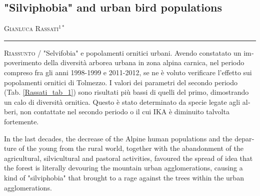 \begin{otherlanguage}{english}
\setcounter{figure}{0}
\setcounter{table}{0}

\begin{adjustwidth}{-3.5cm}{0cm}
\pagestyle{CIOpage}
\chapter*[]{"Silviphobia" and urban bird populations}

\textsc{Gianluca Rassati}$^{1*}$\\

\noindent\color{MUSEBLUE}\rule{27cm}{2pt}
\vspace{1cm}
\end{adjustwidth}

{\small
\noindent\textsc{\color{MUSEBLUE} Riassunto} / "Selvifobia" e popolamenti ornitici urbani. Avendo constatato un impoverimento della diversità arborea
urbana in zona alpina carnica, nel periodo compreso fra gli anni 1998-1999 e 2011-2012, se ne è voluto verificare
l’effetto sui popolamenti ornitici di Tolmezzo. I valori dei parametri del secondo periodo (Tab. \ref{Rassati_tab_1}) sono risultati più
bassi di quelli del primo, dimostrando un calo di diversità ornitica. Questo è stato determinato da specie legate agli
alberi, non contattate nel secondo periodo o il cui IKA è diminuito talvolta fortemente. \\
}

\vspace{1cm}
In the last decades, the decrease of the Alpine human populations and the departure of the young from
the rural world, together with the abandonment of the agricultural, silvicultural and pastoral activities, favoured the
spread of idea that the forest is literally devouring the mountain urban agglomerations, causing a kind of
"silviphobia" that brought to a rage against the trees within the urban agglomerations.


\end{otherlanguage}
